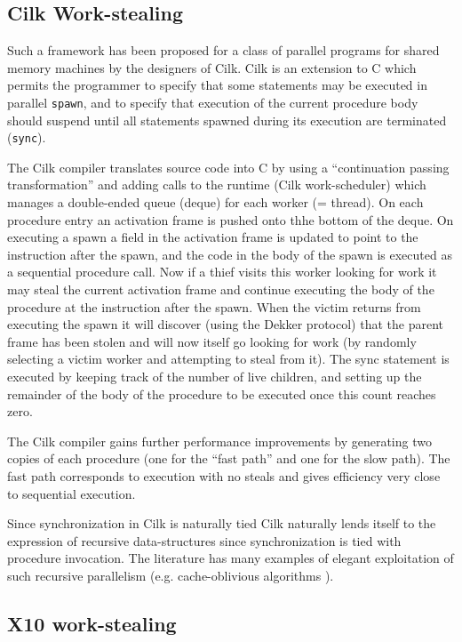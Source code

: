 \documentclass[10pt]{article}
\numberwithin{equation}{section}
\def\Xten{{\sf X10}}
\begin{document}
\subsection{Cilk Work-stealing}

Such a framework has been proposed for a class of parallel programs 
for shared memory machines by
the designers of Cilk. Cilk is an extension to C which permits the
programmer to specify that some statements may be executed in parallel
{\tt spawn}, and to specify that execution of the current procedure
body should suspend until all statements spawned during its execution
are terminated ({\tt sync}).

The Cilk compiler translates source code into C by using a
``continuation passing transformation'' and adding calls to the
runtime (Cilk work-scheduler) which manages a double-ended queue
(deque) for each worker (= thread). On each procedure entry an
activation frame is pushed onto thhe bottom of the deque. On executing
a spawn a field in the activation frame is updated to point to the
instruction after the spawn, and the code in the body of the spawn is
executed as a sequential procedure call. Now if a thief visits this
worker looking for work it may steal the current activation frame and
continue executing the body of the procedure at the instruction after
the spawn. When the victim returns from executing the spawn it will
discover (using the Dekker protocol) that the parent frame has been
stolen and will now itself go looking for work (by randomly selecting
a victim worker and attempting to steal from it). The sync statement
is executed by keeping track of the number of live children, and
setting up the remainder of the body of the procedure to be executed
once this count reaches zero. 

The Cilk compiler gains further performance improvements by generating
two copies of each procedure (one for the ``fast path'' and one for
the slow path). The fast path corresponds to execution with no steals
and gives efficiency very close to sequential execution.

Since synchronization in Cilk is naturally tied 
Cilk naturally lends itself to the expression of recursive
data-structures since synchronization is tied with procedure
invocation. The literature has many examples of elegant exploitation
of such recursive parallelism (e.g.{} cache-oblivious algorithms
\cite{frigo}). 

\subsection{\Xten{} work-stealing}
\end{document}

